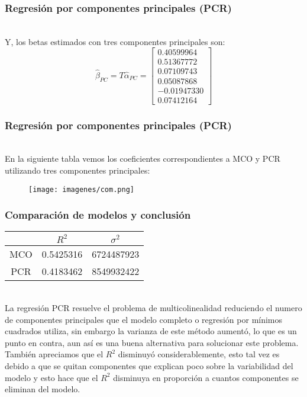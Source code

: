 \documentclass[12pt]{beamer}
\begin{document}
\begin{frame}
\frametitle{Regresión por componentes principales (PCR)}
~\\Y, los betas estimados con tres componentes principales son:
$$\hat{\beta}_{PC}=T\hat{\alpha}_{PC}=\left[\begin{matrix}
 0.40599964 \\ 
 0.51367772 \\ 
 0.07109743 \\ 
 0.05087868 \\ 
 -0.01947330 \\ 
 0.07412164
 \end{matrix}\right]$$
\end{frame}

\begin{frame}
\frametitle{Regresión por componentes principales (PCR)}
~\\En la siguiente tabla vemos los coeficientes correspondientes a MCO y PCR utilizando tres componentes principales:
\begin{figure}[!h]
    \begin{center}
        \texttt{[image: imagenes/com.png]}
        \label{fig:Densidad}
    \end{center}
\end{figure}
\end{frame}

\begin{frame}
\frametitle{Comparación de modelos y conclusión}
\begin{center}
\begin{tabular}{|ccc|}
\hline 
 & $R^2$ & $\sigma^2$ \\ 
\hline 
MCO & 0.5425316 & 6724487923 \\ 
\hline 
PCR & 0.4183462 & 8549932422 \\ 
\hline 
\end{tabular} 
\end{center}
~\\La regresión PCR resuelve el problema de multicolinealidad reduciendo el numero de componentes principales que el modelo completo o regresión por mínimos cuadrados utiliza, sin embargo la varianza de este método aumentó, lo que es un punto en contra, aun así es una buena alternativa para solucionar este problema. También apreciamos que el $R^2$ disminuyó considerablemente, esto tal vez es debido a que se quitan componentes que explican poco sobre la variabilidad del modelo y esto hace que el $R^2$ disminuya en proporción a cuantos componentes se eliminan del modelo.
\end{frame}
\end{document}
